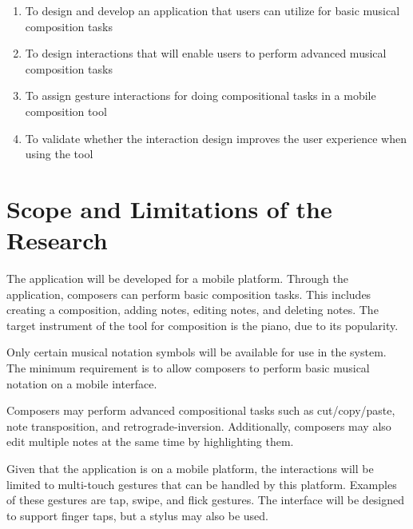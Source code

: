 \begin{enumerate}
	\item To design and develop an application that users can utilize for basic musical composition tasks
    \item To design interactions that will enable users to perform advanced musical composition tasks
    \item To assign gesture interactions for doing compositional tasks in a mobile composition tool
    \item To validate whether the interaction design improves the user experience when using the tool

\end{enumerate}

\section{Scope and Limitations of the Research}
\label{sec:scopelimitations}

The application will be developed for a mobile platform. Through the application, composers can perform basic composition tasks. This includes creating a composition, adding notes, editing notes, and deleting notes. The target instrument of the tool for composition is the piano, due to its popularity.

Only certain musical notation symbols will be available for use in the system. The minimum requirement is to allow composers to perform basic musical notation on a mobile interface.


Composers may perform advanced compositional tasks such as cut/copy/paste, note transposition, and retrograde-inversion. Additionally, composers may also edit multiple notes at the same time by highlighting them. 

Given that the application is on a mobile platform, the interactions will be limited to multi-touch gestures that can be handled by this platform. Examples of these gestures are tap, swipe, and flick gestures. The interface will be designed to support finger taps, but a stylus may also be used.

